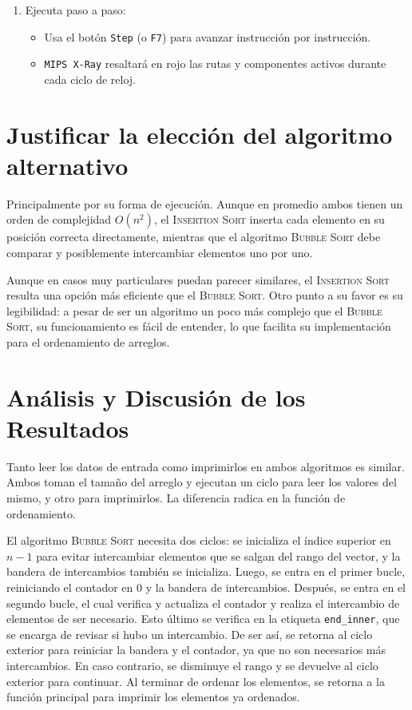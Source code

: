 \documentclass{article}
\begin{document}
\begin{itemize}
\begin{itemize}[label=--]
\begin{enumerate}
    \item Ejecuta paso a paso:
    \begin{itemize}
        \item Usa el botón \texttt{Step} (o \texttt{F7}) para avanzar instrucción por instrucción.
        \item \texttt{MIPS X-Ray} resaltará en rojo las rutas y componentes activos durante cada ciclo de reloj.
    \end{itemize}
\end{enumerate}

\section{Justificar la elección del algoritmo alternativo}

Principalmente por su forma de ejecución. Aunque en promedio ambos tienen un orden de complejidad \(O(n^2)\), el \textsc{Insertion Sort} inserta cada elemento en su posición correcta directamente, mientras que el algoritmo \textsc{Bubble Sort} debe comparar y posiblemente intercambiar elementos uno por uno.

Aunque en casos muy particulares puedan parecer similares, el \textsc{Insertion Sort} resulta una opción más eficiente que el \textsc{Bubble Sort}. Otro punto a su favor es su legibilidad: a pesar de ser un algoritmo un poco más complejo que el \textsc{Bubble Sort}, su funcionamiento es fácil de entender, lo que facilita su implementación para el ordenamiento de arreglos.

\section{ Análisis y Discusión de los Resultados}

Tanto leer los datos de entrada como imprimirlos en ambos algoritmos es similar. Ambos toman el tamaño del arreglo y ejecutan un ciclo para leer los valores del mismo, y otro para imprimirlos. La diferencia radica en la función de ordenamiento.

El algoritmo \textsc{Bubble Sort} necesita dos ciclos: se inicializa el índice superior en \(n-1\) para evitar intercambiar elementos que se salgan del rango del vector, y la bandera de intercambios también se inicializa. Luego, se entra en el primer bucle, reiniciando el contador en \(0\) y la bandera de intercambios. Después, se entra en el segundo bucle, el cual verifica y actualiza el contador y realiza el intercambio de elementos de ser necesario. Esto último se verifica en la etiqueta \texttt{end\_inner}, que se encarga de revisar si hubo un intercambio. De ser así, se retorna al ciclo exterior para reiniciar la bandera y el contador, ya que no son necesarios más intercambios. En caso contrario, se disminuye el rango y se devuelve al ciclo exterior para continuar. Al terminar de ordenar los elementos, se retorna a la función principal para imprimir los elementos ya ordenados.


\end{itemize}
\end{itemize}
\end{document}
